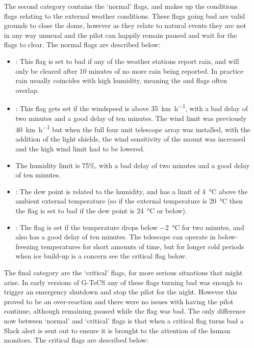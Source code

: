 \begin{colsection}
\begin{colsection}
The second category contains the `normal' flags, and makes up the conditions flags relating to the external weather conditions. These flags going bad are valid grounds to close the dome, however as they relate to natural events they are not in any way unusual and the pilot can happily remain paused and wait for the flags to clear. The normal flags are described below:

\begin{itemize}
    \item {}: This flag is set to bad if any of the weather stations report rain, and will only be cleared after 10 minutes of no more rain being reported. In practice rain usually coincides with high humidity, meaning the  and  flags often overlap.

    \item {}: This flag gets set if the windspeed is above \SI{35}{\kilo\meter\per\hour}, with a bad delay of two minutes and a good delay of ten minutes. The wind limit was previously \SI{40}{\kilo\metre\per\hour} but when the full four unit telescope array was installed, with the addition of the light shields, the wind sensitivity of the mount was increased and the high wind limit had to be lowered.

    \item {} The humidity limit is 75\%, with a bad delay of two minutes and a good delay of ten minutes.

    \item {}: The dew point is related to the humidity, and has a limit of \SI{4}{\celsius} above the ambient external temperature (so if the external temperature is \SI{20}{\celsius} then the flag is set to bad if the dew point is \SI{24}{\celsius} or below).

    \item {}: The  flag is set if the temperature drops below \SI{-2}{\celsius} for two minutes, and also has a good delay of ten minutes. The telescope can operate in below-freezing temperatures for short amounts of time, but for longer cold periods when ice build-up is a concern see the critical  flag below.

\end{itemize}

The final category are the `critical' flags, for more serious situations that might arise. In early versions of G-TeCS any of these flags turning bad was enough to trigger an emergency shutdown and stop the pilot for the night. However this proved to be an over-reaction and there were no issues with having the pilot continue, although remaining paused while the flag was bad. The only difference now between `normal' and `critical' flags is that when a critical flag turns bad a Slack alert is sent out to ensure it is brought to the attention of the human monitors. The critical flags are described below:


\end{colsection}
\end{colsection}
